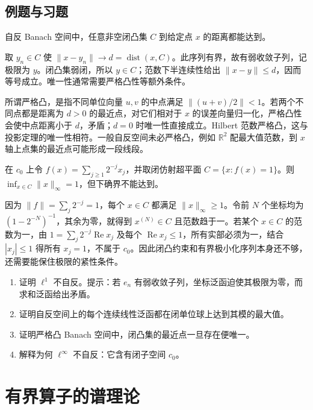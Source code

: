 \documentclass[UTF8,12pt,a4paper,fontset=fandol]{ctexbook}
\begin{document}
\section{例题与习题}
\begin{example}[最近点存在]
自反 Banach 空间中，任意非空闭凸集 $C$ 到给定点 $x$ 的距离都能达到。
\end{example}
\begin{solve}
取 $y_n\in C$ 使 $\|x-y_n\|\to d=\operatorname{dist}(x,C)$。此序列有界，故有弱收敛子列，记极限为 $y$。闭凸集弱闭，所以 $y\in C$；范数下半连续性给出 $\|x-y\|\leq d$，因而等号成立。唯一性通常需要严格凸性等额外条件。
\end{solve}

所谓严格凸，是指不同单位向量 $u,v$ 的中点满足 $\|(u+v)/2\|<1$。若两个不同点都是距离为 $d>0$ 的最近点，对它们相对于 $x$ 的误差向量归一化，严格凸性会使中点距离小于 $d$，矛盾；$d=0$ 时唯一性直接成立。Hilbert 范数严格凸，这与投影定理的唯一性相符。一般自反空间未必严格凸，例如 $\mathbb R^2$ 配最大值范数，到 $x$ 轴上点集的最近点可能形成一段线段。

\begin{example}[缺少自反性时的闭凸极小化问题]
在 $c_0$ 上令 $f(x)=\sum_{j\geq1}2^{-j}x_j$，并取闭仿射超平面 $C=\{x:f(x)=1\}$。则 $\inf_{x\in C}\|x\|_\infty=1$，但下确界不能达到。
\end{example}
\begin{solve}
因为 $\|f\|=\sum_j2^{-j}=1$，每个 $x\in C$ 都满足 $\|x\|_\infty\geq1$。令前 $N$ 个坐标均为 $(1-2^{-N})^{-1}$，其余为零，就得到 $x^{(N)}\in C$ 且范数趋于一。若某个 $x\in C$ 的范数为一，由 $1=\sum_j2^{-j}\operatorname{Re}x_j$ 及每个 $\operatorname{Re}x_j\leq1$，所有实部必须为一，结合 $|x_j|\leq1$ 得所有 $x_j=1$，不属于 $c_0$。因此闭凸约束和有界极小化序列本身还不够，还需要能保住极限的紧性条件。
\end{solve}
\begin{enumerate}
 \item 证明 $\ell^1$ 不自反。提示：若 $e_n$ 有弱收敛子列，坐标泛函迫使其极限为零，而求和泛函给出矛盾。
 \item\label{exer:fa-norm-attainment} 证明自反空间上的每个连续线性泛函都在闭单位球上达到其模的最大值。
 \item 证明严格凸 Banach 空间中，闭凸集的最近点一旦存在便唯一。
 \item 解释为何 $\ell^\infty$ 不自反：它含有闭子空间 $c_0$。
\end{enumerate}

\chapter{有界算子的谱理论}
\label{chap:fa-spectrum}
\end{document}
